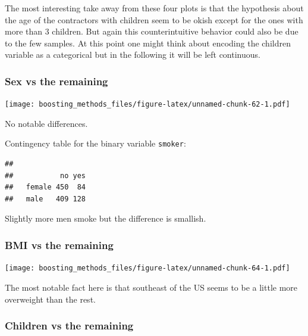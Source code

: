 \documentclass[
]{book}
\newenvironment{Shaded}{\begin{snugshade}}{\end{snugshade}}
\newcommand{\CommentTok}[1]{\textcolor[rgb]{0.56,0.35,0.01}{\textit{#1}}}
\newcommand{\FunctionTok}[1]{\textcolor[rgb]{0.00,0.00,0.00}{#1}}
\newcommand{\NormalTok}[1]{#1}
\newcommand{\SpecialCharTok}[1]{\textcolor[rgb]{0.00,0.00,0.00}{#1}}
\begin{document}
The most interesting take away from these four plots is that the hypothesis about the age of the contractors with children seem to be okish except for the ones with more than 3 children. But again this counterintuitive behavior could also be due to the few samples. At this point one might think about encoding the children variable as a categorical but in the following it will be left continuous.

\hypertarget{sex-vs-the-remaining}{%
\subsubsection{Sex vs the remaining}\label{sex-vs-the-remaining}}

\texttt{[image: boosting\_methods\_files/figure-latex/unnamed-chunk-62-1.pdf]}

No notable differences.

Contingency table for the binary variable \texttt{smoker}:

\begin{Shaded}
\end{Shaded}

\begin{verbatim}
##         
##           no yes
##   female 450  84
##   male   409 128
\end{verbatim}

Slightly more men smoke but the difference is smallish.

\hypertarget{bmi-vs-the-remaining}{%
\subsubsection{BMI vs the remaining}\label{bmi-vs-the-remaining}}

\texttt{[image: boosting\_methods\_files/figure-latex/unnamed-chunk-64-1.pdf]}

The most notable fact here is that southeast of the US seems to be a little more overweight than the rest.

\hypertarget{children-vs-the-remaining}{%
\subsubsection{Children vs the remaining}\label{children-vs-the-remaining}}
\end{document}
